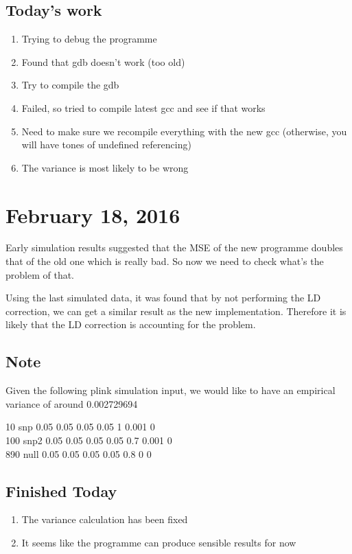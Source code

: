 \documentclass[12pt]{article}
\begin{document}
	\subsection{Today's work}
	\begin{enumerate}
		\item Trying to debug the programme
		\item Found that gdb doesn't work (too old)
		\item Try to compile the gdb
		\item Failed, so tried to compile latest gcc and see if that works
		\item Need to make sure we recompile everything with the new gcc (otherwise, you will have tones of undefined referencing)
		\item The variance is most likely to be wrong
	\end{enumerate}
	\section{February 18, 2016}
	Early simulation results suggested that the MSE of the new programme doubles that of the old one which is really bad. 
	So now we need to check what's the problem of that.
	
	Using the last simulated data, it was found that by not performing the LD correction, we can get a similar result as the new implementation. 
	Therefore it is likely that the LD correction is accounting for the problem.
	
	\subsection{Note}
	Given the following plink simulation input, we would like to have an empirical variance of around 0.002729694
	
	\begin{tabular}[r]
	10 snp 0.05 0.05 0.05 0.05 1 0.001 0\\
	100 snp2 0.05 0.05 0.05 0.05 0.7 0.001 0\\
	890 null 0.05 0.05 0.05 0.05 0.8 0 0\\
	\end{tabular}
	
	\subsection{Finished Today}
	\begin{enumerate}
		\item The variance calculation has been fixed
		\item It seems like the programme can produce sensible results for now
	\end{enumerate}
\end{document}
